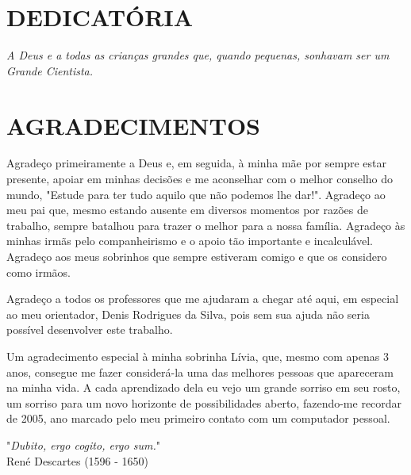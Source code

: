 \documentclass[brazil]{abnt-UVV/abnt-uvv}
\begin{document}
\chapter*{DEDICATÓRIA}
 \vspace*{15cm}
 \begin{flushright}
 {
    \large {
        \em {A Deus e a todas as crianças grandes que, quando pequenas, sonhavam ser um Grande Cientista.}
    }
}
\end{flushright}
\pagebreak


\chapter*{AGRADECIMENTOS}

Agradeço primeiramente a Deus e, em seguida, à minha mãe por sempre estar presente, apoiar em minhas decisões e me aconselhar com o melhor conselho do mundo, "Estude para ter tudo aquilo que não podemos lhe dar!". Agradeço ao meu pai que, mesmo estando ausente em diversos momentos por razões de trabalho, sempre batalhou para trazer o melhor para a nossa família. Agradeço às minhas irmãs pelo companheirismo e o apoio tão importante e incalculável. Agradeço aos meus sobrinhos que sempre estiveram comigo e que os considero como irmãos.

Agradeço a todos os professores que me ajudaram a chegar até aqui, em especial ao meu orientador, Denis Rodrigues da Silva, pois sem sua ajuda não seria possível desenvolver este trabalho.

Um agradecimento especial à minha sobrinha Lívia, que, mesmo com apenas 3 anos, consegue me fazer considerá-la uma das melhores pessoas que apareceram na minha vida. A cada aprendizado dela eu vejo um grande sorriso em seu rosto, um sorriso para um novo horizonte de possibilidades aberto, fazendo-me recordar de 2005, ano marcado pelo meu primeiro contato com um computador pessoal.

\pagebreak

\vspace*{15cm}
\begin{flushright}{}"\emph{Dubito, ergo cogito, ergo sum.}"\\
{\small René Descartes (1596 - 1650)}\end{flushright}{\small \par}
\vfill{}
\pagebreak
\end{document}
